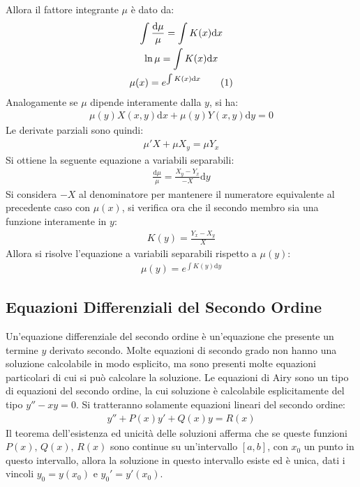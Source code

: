 \documentclass{article}
\newcommand{\df}{\mathrm{d}}
\numberwithin{equation}{subsection}
\newcommand{\tageq}{\tag{\stepcounter{equation}\theequation}}
\begin{document}
Allora il fattore integrante $\mu$ è dato da:
\begin{gather*}
    \int\frac{\df\mu}{\mu}=\int K(x)\df x\\
    \ln\mu=\int K(x)\df x\\
    \mu(x)=e^{\int K(x)\df x}\tageq
\end{gather*}
Analogamente se $\mu$ dipende interamente dalla $y$, si ha:
\begin{gather*}
    \mu(y)X(x,y)\df x+\mu(y)Y(x,y)\df y=0    
\end{gather*}
Le derivate parziali sono quindi:
\begin{gather*}
    \mu'X+\mu X_y=\mu Y_x
\end{gather*}
Si ottiene la seguente equazione a variabili separabili:
\begin{gather*}
    \frac{\df\mu}{\mu}=\frac{X_y-Y_x}{-X}\df y
\end{gather*}
Si considera $-X$ al denominatore per mantenere il numeratore equivalente al precedente caso con $\mu(x)$, si verifica ora che il secondo membro sia una funzione interamente in $y$:
\begin{gather*}
    K(y)=\frac{Y_x-X_y}{X}
\end{gather*}
Allora si risolve l'equazione a variabili separabili rispetto a $\mu(y)$:
\begin{gather*}
    \mu(y)=e^{\int K(y)\df y}
\end{gather*}

\subsection{Equazioni Differenziali del Secondo Ordine}

Un'equazione differenziale del secondo ordine è un'equazione che presente un termine $y$ derivato secondo. Molte equazioni di secondo grado non hanno una soluzione calcolabile in modo esplicito, ma sono presenti molte equazioni particolari di cui si può calcolare la soluzione. 
Le equazioni di Airy sono un tipo di equazioni del secondo ordine, la cui soluzione è calcolabile esplicitamente del tipo $y''-xy=0$. 
Si tratteranno solamente equazioni lineari del secondo ordine:
\begin{gather}
    y''+P(x)y'+Q(x)y=R(x)
\end{gather}
Il teorema dell'esistenza ed unicità delle soluzioni afferma che se queste funzioni $P(x),\,Q(x),\,R(x)$ sono continue su un'intervallo $[a,b]$, con $x_0$ un punto in questo intervallo, allora la soluzione in questo intervallo esiste ed è unica, dati i vincoli $y_0=y(x_0)$ e $y_0'=y'(x_0)$. 
\end{document}
